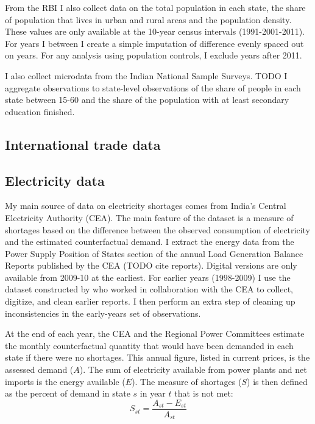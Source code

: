 \documentclass[11pt]{article}
\begin{document}
From the RBI I also collect data on the total population in each state, the share of population that lives in urban and rural areas and the population density. These values are only available at the 10-year census intervals (1991-2001-2011). For years I between I create a simple imputation of difference evenly spaced out on years. For any analysis using population controls, I exclude years after 2011.

I also collect microdata from the Indian National Sample Surveys. TODO I aggregate observations to state-level observations of the share of people in each state between 15-60 and the share of the population with at least secondary education finished.

\subsection{International trade data}%
\label{sub:international_trade_data}



\subsection{Electricity data}%
\label{sub:energy_data}

My main source of data on electricity shortages comes from India's Central Electricity Authority (CEA). The main feature of the dataset is a measure of shortages based on the difference between the observed consumption of electricity and the estimated counterfactual demand. I extract the energy data from the Power Supply Position of States section of the annual Load Generation Balance Reports published by the CEA (TODO cite reports). Digital versions are only available from 2009-10 at the earliest. For earlier years (1998-2009) I use the dataset constructed by \cite{allcott_how_2016} who worked in collaboration with the CEA to collect, digitize, and clean earlier reports. I then perform an extra step of cleaning up inconsistencies in the early-years set of observations.

At the end of each year, the CEA and the Regional Power Committees estimate the monthly counterfactual quantity that would have been demanded in each state if there were no shortages. This annual figure, listed in current prices, is the assessed demand (\(A\)). The sum of electricity available from power plants and net imports is the energy available ($E$). The measure of shortages (\(S\)) is then defined as the percent of demand in state \(s\) in year \(t\) that is not met:
\[
S_{st} = \frac{A_{st} - E_{st} }{A_{st}}
\]
\end{document}
